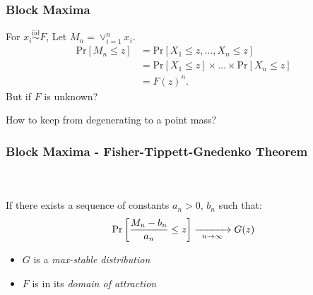 \documentclass[aspectratio=169]{beamer}
\begin{document}
\begin{frame}
  \frametitle{Block Maxima}
  For $x_i \stackrel{\text{iid}}{\sim} F$, Let $M_n = \vee_{i=1}^n x_i$.
  \begin{equation*}
    \begin{aligned}
      \text{Pr}\left[M_n\leq z\right] &= \text{Pr}\left[X_1 \leq z, \ldots, X_n \leq z\right]\\
        &= \text{Pr}\left[X_1\leq z\right]\times\ldots\times\text{Pr}\left[X_n\leq z\right]\\
        &= F(z)^n.
    \end{aligned}
  \end{equation*}
  But if $F$ is unknown?

  How to keep from degenerating to a point mass?
\end{frame} %

\begin{frame}
  \frametitle{Block Maxima - Fisher-Tippett-Gnedenko Theorem}
  {\scriptsize\cite{dehaan2006}}\\~\vspace{0.5cm}\\
  If there exists a sequence of constants $a_n > 0$, $b_n$ such that:
  \begin{equation*}
    \text{Pr}\left[\frac{M_n - b_n}{a_n} \leq z\right] \xrightarrow[\enskip n\to\infty\enskip]{} G(z)
  \end{equation*}
    \begin{itemize}
        \item $G$ is a \emph{max-stable distribution}
        \item $F$ is in its \emph{domain of attraction}
    \end{itemize}
\end{frame} %
\end{document}
